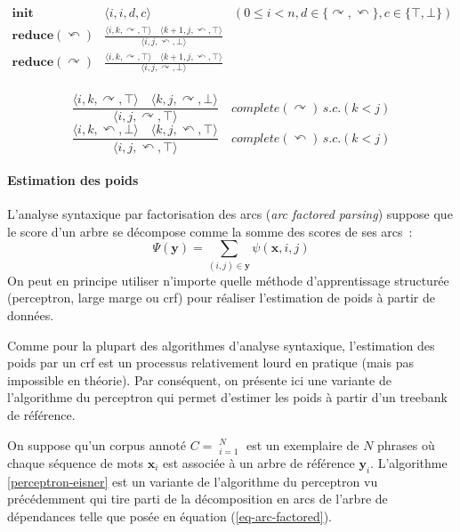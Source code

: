 \documentclass[11pt,openany]{book}
\begin{document}
\begin{eqnarray*}
\mathbf{init}&\langle i,i,d,c\rangle &
(0\leq i < n , d\in \{\curvearrowright , \curvearrowleft\}, c \in
\{\top ,\bot \})\\
\mathbf{reduce}(\curvearrowleft)&
\frac{\langle i,k,\curvearrowright,\top \rangle\quad \langle k+1,j,\curvearrowleft,\top \rangle}
{\langle i,j,\curvearrowleft,\bot \rangle} \\
\mathbf{reduce}(\curvearrowright)&\frac{\langle i,k,\curvearrowright,\top \rangle\quad \langle k+1,j,\curvearrowleft,\top \rangle}
{\langle i,j,\curvearrowright,\bot \rangle}\\
\end{eqnarray*}

\begin{displaymath}
\frac{\langle i,k,\curvearrowright,\top \rangle\quad \langle k,j,\curvearrowright,\bot \rangle}
{\langle i,j,\curvearrowright,\top \rangle} \quad complete(\curvearrowright) \, s.c. (k < j)
\end{displaymath}
\begin{displaymath}
\frac{\langle i,k,\curvearrowleft,\bot \rangle\quad \langle k,j,\curvearrowleft,\top \rangle}
{\langle i,j,\curvearrowleft,\top \rangle} \quad complete(\curvearrowleft) \, s.c. (k < j)
\end{displaymath}

\paragraph{Estimation des poids} L'analyse syntaxique par factorisation des
arcs ({\em arc factored parsing}) suppose que le score d'un arbre se
décompose comme la somme des scores de ses arcs~:
\begin{equation}
\label{eq-arc-factored}
\Psi({\mathbf{y}}) = \sum_{(i,j) \in \mathbf{y}} \psi(\mathbf{x},i,j)
\end{equation}
On peut en principe utiliser n'importe quelle méthode d'apprentissage 
structurée (perceptron, large marge ou {\sc crf}) 
pour réaliser l'estimation de poids à partir de données.

Comme pour la plupart des algorithmes d'analyse syntaxique, 
l'estimation des poids par un {\sc crf} est un processus relativement
lourd en pratique (mais pas impossible en théorie). Par conséquent, on présente ici une variante de
l'algorithme du perceptron qui permet d'estimer les poids à partir
d'un treebank de référence.

On suppose qu’un corpus annoté $C = \mathop{(\mathbf{x}_i,\mathbf{y}_i)}^N_{i=1}$ est un
exemplaire de $N$ phrases où chaque séquence de mots $\mathbf{x}_i$
est associée à un arbre de référence $\mathbf{y}_i$.
L'algorithme \ref{perceptron-eisner} est un variante de l'algorithme
du perceptron vu précédemment qui tire parti de la décomposition
en arcs de l'arbre de dépendances telle que posée en équation (\ref{eq-arc-factored}).
\end{document}
